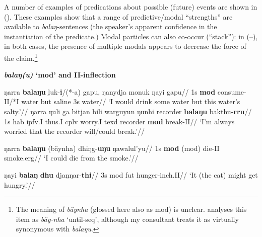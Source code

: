 A number of examples of predications about possible (future) events are shown in (\nextx). These examples show that a range of predictive/modal ``strengths'' are available to \textit{balaŋ}-sentences (the speaker's apparent confidence in the instantiation of the predicate.) Modal particles can also co-occur (``stack''): in (--), in both cases, the presence of multiple modals appears to decrease the force of the claim.\footnote{The meaning of \textit{bäynha} (glossed here also as \gls{mod}) is unclear. \citet[670]{Wilkinson1991} analyses this item as \textit{bäy-nha} `until-\gls{seq}', although my consultant treats it as virtually synonymous with \textit{balaŋu}.
}

\pex \textbf{\textit{balaŋ(u)} `\gls{mod}' and \gls{II}-inflection}

\a\begingl\gla ŋarra \textbf{balaŋu} ḻuk-\textbf{i}/(*-a) gapu, ŋanydja monuk ŋayi gapu//
\glb 1s \textbf{\gls{mod}} consume-\gls{II}/*\gls{I} water but saline 3s water//
\glft`I would drink some water but this water's salty.'\trailingcitation{[DhG~20190405]}//\endgl
\a\begingl\gla ŋarra ŋuli ga bitjan bili warguyun ŋunhi \textup{recorder} \textbf{balaŋu} bakthu-\textbf{rru}//
\glb 1s \gls{hab} \gls{ipfv}.\gls{I} thus.\gls{I} \gls{cplv} worry.\gls{I} \gls{texd} recorder \textbf{\gls{mod}} break-\gls{II}// 
\glft`I'm always worried that the recorder will/could break.'\trailingcitation{[DhG~20190417]}//\endgl

\a\begingl\gla ŋarra \textbf{balaŋu} (bäynha) dhiŋg-\textbf{uŋu} ŋawalul'yu//
\glb 1s \textbf{\gls{mod}} (\gls{mod}) die-\gls{II} smoke.\gls{erg}//
\glft`I could die from the smoke.'\trailingcitation{[DhG~20190405]}//\endgl

\a\begingl\gla ŋayi \textbf{balaŋ} \textbf{dhu} djaṉŋar-\textbf{thi}//
\glb 3s \gls{mod} \gls{fut} hunger-\gls{inch}.\gls{II}//
\glft`It (the cat) might get hungry.'\trailingcitation{[AW~20190429]}//\endgl



